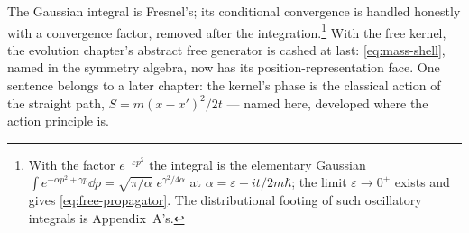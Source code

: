 The Gaussian integral is Fresnel's; its conditional convergence is handled honestly with a convergence factor, removed after the integration.\footnote{With the factor $e^{-\varepsilon p^2}$ the integral is the elementary Gaussian $\int e^{-\alpha p^2 + \gamma p}\dd p = \sqrt{\pi/\alpha}\;e^{\gamma^2/4\alpha}$ at $\alpha = \varepsilon + it/2m\hbar$; the limit $\varepsilon \to 0^{+}$ exists and gives \eqref{eq:free-propagator}. The distributional footing of such oscillatory integrals is Appendix~A's.} With the free kernel, the evolution chapter's abstract free generator is cashed at last: \eqref{eq:mass-shell}, named in the symmetry algebra, now has its position-representation face. One sentence belongs to a later chapter: the kernel's phase is the classical action of the straight path, $S = m(x - x')^2/2t$ --- named here, developed where the action principle is.

